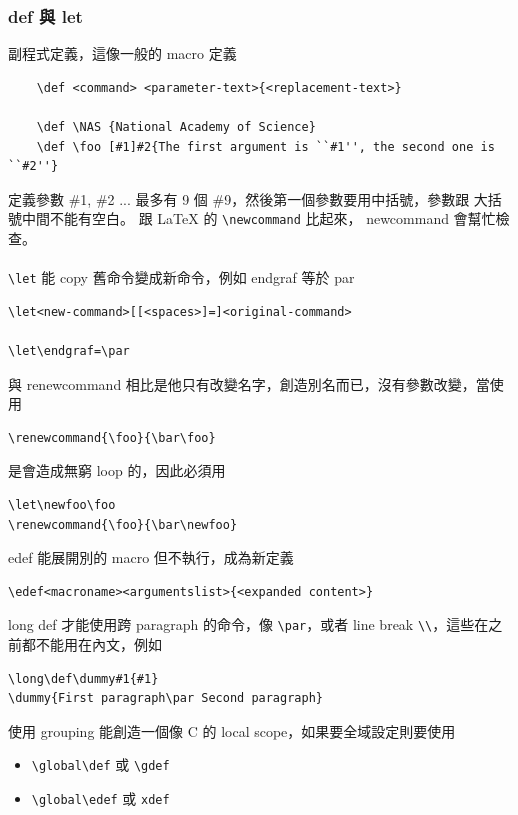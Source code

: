     \subsubsection{def 與 let}
    副程式定義，這像一般的 macro 定義
    \begin{verbatim}
    \def <command> <parameter-text>{<replacement-text>}

    \def \NAS {National Academy of Science}
    \def \foo [#1]#2{The first argument is ``#1'', the second one is ``#2''}
    \end{verbatim}
    定義參數 \#1, \#2 ... 最多有 9 個 \#9，然後第一個參數要用中括號，參數跟
    大括號中間不能有空白。 跟 \LaTeX{} 的 \verb=\newcommand= 比起來，
    newcommand 會幫忙檢查。
    \\\\
    \verb=\let= 能 copy 舊命令變成新命令，例如 endgraf 等於 par
    \begin{verbatim}
\let<new-command>[[<spaces>]=]<original-command>

\let\endgraf=\par
    \end{verbatim}
    與 renewcommand 相比是他只有改變名字，創造別名而已，沒有參數改變，當使用
    \begin{verbatim}
\renewcommand{\foo}{\bar\foo}
    \end{verbatim}
    是會造成無窮 loop 的，因此必須用
    \begin{verbatim}
\let\newfoo\foo
\renewcommand{\foo}{\bar\newfoo}
    \end{verbatim}
    edef 能展開別的 macro 但不執行，成為新定義
    \begin{verbatim}
\edef<macroname><argumentslist>{<expanded content>}
    \end{verbatim}
    long def 才能使用跨 paragraph 的命令，像 \verb=\par=，或者 line break
    \verb=\\=，這些在之前都不能用在內文，例如
    \begin{verbatim}
\long\def\dummy#1{#1}
\dummy{First paragraph\par Second paragraph}
    \end{verbatim}
    使用 grouping 能創造一個像 C 的 local scope，如果要全域設定則要使用
    \begin{itemize}
      \item \verb=\global\def= 或 \verb=\gdef=
      \item \verb=\global\edef= 或 \verb=xdef=
    \end{itemize}

